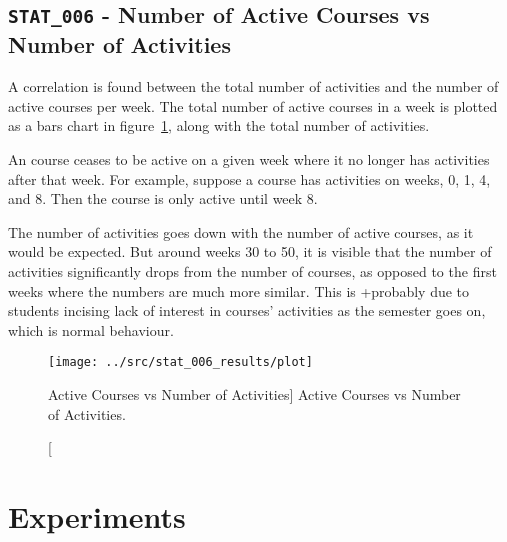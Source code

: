 \subsection{\texttt{STAT\_006} - Number of Active Courses vs Number of
Activities}
\label{sec:stat_006}

A correlation is found between the total number of activities and the number of
active courses per week. The total number of active courses in a week is
plotted as a bars chart in figure~\ref{fig:stat_006}, along with the total
number of activities.

An course ceases to be active on a given week where it no longer has activities
after that week. For example, suppose a course has activities on weeks, 0, 1,
4, and 8. Then the course is only active until week 8.

The number of activities goes down with the number of active courses, as it
would be expected. But around weeks 30 to 50, it is visible that the number of
activities significantly drops from the number of courses, as opposed to the
first weeks where the numbers are much more similar. This is +probably due to
students incising lack of interest in courses' activities as the semester goes
on, which is normal behaviour.

\begin{figure}[h!]
    \centering

    \texttt{[image: ../src/stat\_006\_results/plot]}

    \caption
        [Active Courses vs Number of Activities]
        {Active Courses vs Number of Activities.}

    \label{fig:stat_006}
\end{figure}

\section{Experiments}
